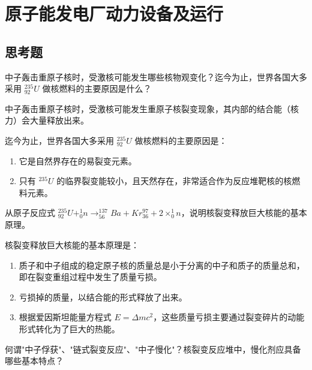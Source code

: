 \chapter{原子能发电厂动力设备及运行}

\section{思考题}

\begin{problem}
中子轰击重原子核时，受激核可能发生哪些核物观变化？迄今为止，世界各国大多采用 \(^{235}_{92}U\) 做核燃料的主要原因是什么？
\end{problem}

\begin{solution}
中子轰击重原子核时，受激核可能发生重原子核裂变现象，其内部的结合能（核力）会大量释放出来。

迄今为止，世界各国大多采用 \(^{235}_{92}U\) 做核燃料的主要原因是：
\begin{enumerate}
  \item 它是自然界存在的易裂变元素。
  \item 只有 \(^{235}U\) 的临界裂变能较小，且天然存在，非常适合作为反应堆靶核的核燃料元素。
\end{enumerate}
\end{solution}

\begin{problem}
从原子反应式 \(^{235}_{92}U + ^{1}_{0}n \rightarrow ^{137}_{56}Ba + Kr^{97}_{36} + 2 \times ^{1}_{0}n\)，说明核裂变释放巨大核能的基本原理。
\end{problem}

\begin{solution}
核裂变释放巨大核能的基本原理是：
\begin{enumerate}
  \item 质子和中子组成的稳定原子核的质量总是小于分离的中子和质子的质量总和，即在裂变重组过程中发生了质量亏损。
  \item 亏损掉的质量，以结合能的形式释放了出来。
  \item 根据爱因斯坦能量方程式 \(E=\Delta mc^{2}\)，这些质量亏损主要通过裂变碎片的动能形式转化为了巨大的热能。
\end{enumerate}
\end{solution}

\begin{problem}
何谓"中子俘获"、"链式裂变反应"、"中子慢化"？核裂变反应堆中，慢化剂应具备哪些基本特点？
\end{problem}


